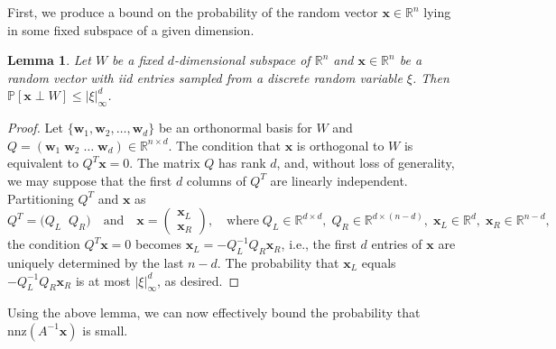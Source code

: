 \documentclass[reqno]{amsart}
\numberwithin{equation}{section}
\newtheorem{lemma}[theorem]{Lemma}
\begin{document}
First, we produce a bound on the probability of the random vector $\bm{x} \in \mathbb{R}^{n}$ lying in some fixed subspace of a given dimension.

\begin{lemma}\label{lm:subspace_ac}
Let $W$ be a fixed $d$-dimensional subspace of $\mathbb{R}^{n}$ and $\bm{x} \in \mathbb{R}^{n}$ be a random vector with iid entries sampled from a discrete random variable $\xi$. Then $\mathbb{P}[\bm{x} \perp W] \le |\xi|_\infty^d$.
\end{lemma}
\begin{proof}
Let $\{\bm{w}_1, \bm{w}_2, \dots, \bm{w}_d\}$ be an orthonormal basis for $W$ and $Q = \left( \bm{w}_1 \; \bm{w}_2 \; \ldots \; \bm{w}_d\right) \in \mathbb{R}^{n \times d}$. The condition that $\bm{x}$ is orthogonal to $W$ is equivalent to $Q^T \bm{x} = 0$. The matrix $Q$ has rank $d$, and, without loss of generality, we may suppose that the first $d$ columns of $Q^T$ are linearly independent. Partitioning $Q^T$ and $\bm{x}$ as
\[
Q^T = \big(Q_L \;\; Q_R \big) \quad \text{and} \quad \bm{x} = \begin{pmatrix} \bm{x}_L \\ \bm{x}_R \end{pmatrix}, \quad \text{where} \; Q_L \in \mathbb{R}^{d \times d}, \; Q_R \in \mathbb{R}^{d \times (n-d)}, \; \bm{x}_L \in \mathbb{R}^d, \; \bm{x}_R \in \mathbb{R}^{n-d},
\]
the condition $Q^T \bm{x} = 0$ becomes $\bm{x}_L = - Q_L^{-1} Q_R \bm{x}_R$, i.e., the first $d$ entries of $\bm{x}$ are uniquely determined by the last $n-d$. The probability that $\bm{x}_L$ equals $- Q_L^{-1} Q_R \bm{x}_R$ is at most $|\xi|_\infty^d$, as desired.
\end{proof}

Using the above lemma, we can now effectively bound the probability that $\mathrm{nnz}(A^{-1} \bm{x})$ is small.
\end{document}
